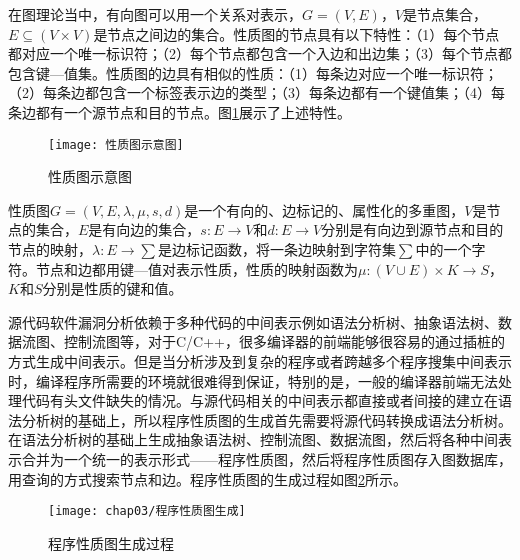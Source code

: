 在图理论当中，有向图可以用一个关系对表示，$G=(V,E)$，$V$是节点集合，$E\subseteq(V \times V)$是节点之间边的集合。性质图的节点具有以下特性：{（1）}每个节点都对应一个唯一标识符；{（2）}每个节点都包含一个入边和出边集；{（3）}每个节点都包含键—值集。性质图的边具有相似的性质：{（1）}每条边对应一个唯一标识符；{（2）}每条边都包含一个标签表示边的类型；{（3）}每条边都有一个键值集；{（4）}每条边都有一个源节点和目的节点。图\ref{性质图示意图}展示了上述特性。


\begin{figure}[htp]
\centering
\texttt{[image: 性质图示意图]}
\caption{性质图示意图}
\label{性质图示意图}
\end{figure}


\begin{definition}
 \label{性质图定义}
 性质图$G=(V,E,\lambda ,\mu, s,d)$是一个有向的、边标记的、属性化的多重图，$V$是节点的集合，$E$是有向边的集合，$s: E \rightarrow V$和$d:E \rightarrow V$分别是有向边到源节点和目的节点的映射，$\lambda : E \rightarrow \sum $是边标记函数，将一条边映射到字符集$\sum$中的一个字符。节点和边都用键—值对表示性质，性质的映射函数为$\mu:(V \cup E) \times K \rightarrow S$，$K$和$S$分别是性质的键和值。
\end{definition}

源代码软件漏洞分析依赖于多种代码的中间表示例如语法分析树、抽象语法树、数据流图、控制流图等，对于C/C++，很多编译器的前端能够很容易的通过插桩的方式生成中间表示。但是当分析涉及到复杂的程序或者跨越多个程序搜集中间表示时，编译程序所需要的环境就很难得到保证，特别的是，一般的编译器前端无法处理代码有头文件缺失的情况。与源代码相关的中间表示都直接或者间接的建立在语法分析树的基础上，所以程序性质图的生成首先需要将源代码转换成语法分析树。在语法分析树的基础上生成抽象语法树、控制流图、数据流图，然后将各种中间表示合并为一个统一的表示形式——程序性质图，然后将程序性质图存入图数据库，用查询的方式搜索节点和边。程序性质图的生成过程如图\ref{程序性质图生成过程}所示。

\begin{figure}[htp]
\centering
\texttt{[image: chap03/程序性质图生成]}
\caption{程序性质图生成过程}
\label{程序性质图生成过程}
\end{figure}

